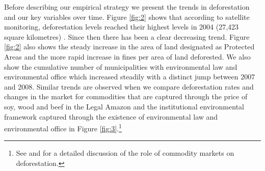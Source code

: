 Before describing our empirical strategy we present the trends in deforestation and our key variables over time. Figure \ref{fig:2} shows that according to satellite monitoring, deforestation levels reached their highest levels in 2004 (27,423 square kilometres) \citep{MMMAwebsite}.  Since then there has been a clear decreasing trend. Figure \ref{fig:2} also shows the steady increase in the area of land designated as Protected Areas and the more rapid increase in fines per area of land deforested. We also show the cumulative number of municipalities with environmental law and environmental office which increased steadily with a distinct jump between 2007 and 2008. Similar trends are observed when we compare deforestation rates and changes in the market for commodities that are captured through the price of soy, wood and beef in the Legal Amazon and the institutional environmental framework captured through the existence of environmental law and environmental office in Figure \ref{fig:3}.\footnote{See \citet{hargrave_kis-katos_2012} and \citet{LAKES} for a detailed discussion of the role of commodity markets on deforestation.}


